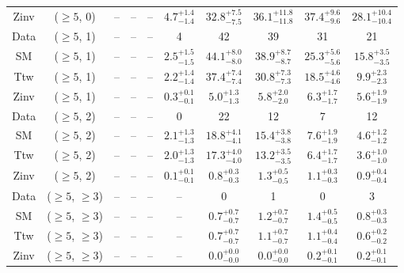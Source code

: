 \begin{table}[h!]
{\begin{tabular}{cccccccccc}
	Zinv & ($\ge5$, 0) & -- & -- & -- & $4.7^{+ 1.4 }_{- 1.4 }$ & $32.8^{+ 7.5 }_{- 7.5 }$ & $36.1^{+ 11.8 }_{- 11.8 }$ & $37.4^{+ 9.6 }_{- 9.6 }$ & $28.1^{+ 10.4 }_{- 10.4 }$ \\[0.5ex] 
	Data & ($\ge5$, 1) & -- & -- & -- & 4 & 42 & 39 & 31 & 21 \\[0.5ex] 
	SM & ($\ge5$, 1) & -- & -- & -- & $2.5^{+ 1.5 }_{- 1.5 }$ & $44.1^{+ 8.0 }_{- 8.0 }$ & $38.9^{+ 8.7 }_{- 8.7 }$ & $25.3^{+ 5.6 }_{- 5.6 }$ & $15.8^{+ 3.5 }_{- 3.5 }$ \\[0.5ex] 
	Ttw & ($\ge5$, 1) & -- & -- & -- & $2.2^{+ 1.4 }_{- 1.4 }$ & $37.4^{+ 7.4 }_{- 7.4 }$ & $30.8^{+ 7.3 }_{- 7.3 }$ & $18.5^{+ 4.6 }_{- 4.6 }$ & $9.9^{+ 2.3 }_{- 2.3 }$ \\[0.5ex] 
	Zinv & ($\ge5$, 1) & -- & -- & -- & $0.3^{+ 0.1 }_{- 0.1 }$ & $5.0^{+ 1.3 }_{- 1.3 }$ & $5.8^{+ 2.0 }_{- 2.0 }$ & $6.3^{+ 1.7 }_{- 1.7 }$ & $5.6^{+ 1.9 }_{- 1.9 }$ \\[0.5ex] 
	Data & ($\ge5$, 2) & -- & -- & -- & 0 & 22 & 12 & 7 & 12 \\[0.5ex] 
	SM & ($\ge5$, 2) & -- & -- & -- & $2.1^{+ 1.3 }_{- 1.3 }$ & $18.8^{+ 4.1 }_{- 4.1 }$ & $15.4^{+ 3.8 }_{- 3.8 }$ & $7.6^{+ 1.9 }_{- 1.9 }$ & $4.6^{+ 1.2 }_{- 1.2 }$ \\[0.5ex] 
	Ttw & ($\ge5$, 2) & -- & -- & -- & $2.0^{+ 1.3 }_{- 1.3 }$ & $17.3^{+ 4.0 }_{- 4.0 }$ & $13.2^{+ 3.5 }_{- 3.5 }$ & $6.4^{+ 1.7 }_{- 1.7 }$ & $3.6^{+ 1.0 }_{- 1.0 }$ \\[0.5ex] 
	Zinv & ($\ge5$, 2) & -- & -- & -- & $0.1^{+ 0.1 }_{- 0.1 }$ & $0.8^{+ 0.3 }_{- 0.3 }$ & $1.3^{+ 0.5 }_{- 0.5 }$ & $1.1^{+ 0.3 }_{- 0.3 }$ & $0.9^{+ 0.4 }_{- 0.4 }$ \\[0.5ex] 
	Data & ($\ge5$, $\ge3$) & -- & -- & -- & -- & 0 & 1 & 0 & 3 \\[0.5ex] 
	SM & ($\ge5$, $\ge3$) & -- & -- & -- & -- & $0.7^{+ 0.7 }_{- 0.7 }$ & $1.2^{+ 0.7 }_{- 0.7 }$ & $1.4^{+ 0.5 }_{- 0.5 }$ & $0.8^{+ 0.3 }_{- 0.3 }$ \\[0.5ex] 
	Ttw & ($\ge5$, $\ge3$) & -- & -- & -- & -- & $0.7^{+ 0.7 }_{- 0.7 }$ & $1.1^{+ 0.7 }_{- 0.7 }$ & $1.1^{+ 0.4 }_{- 0.4 }$ & $0.6^{+ 0.2 }_{- 0.2 }$ \\[0.5ex] 
	Zinv & ($\ge5$, $\ge3$) & -- & -- & -- & -- & $0.0^{+ 0.0 }_{- 0.0 }$ & $0.0^{+ 0.0 }_{- 0.0 }$ & $0.2^{+ 0.1 }_{- 0.1 }$ & $0.2^{+ 0.1 }_{- 0.1 }$ \\[0.5ex] 
	\hline
	\hline
\end{tabular}}
\end{table}
